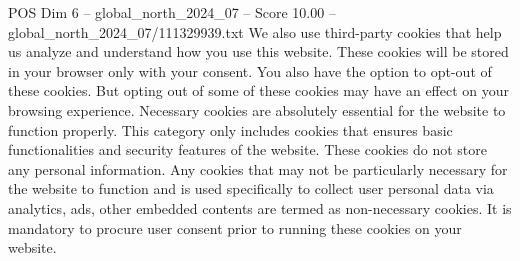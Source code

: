 \begin{textsample}{POS Dim 6 – global\_north\_2024\_07 – Score 10.00 – global\_north\_2024\_07/111329939.txt}
We also use third-party cookies that help us analyze and understand how you use this website.
These cookies will be stored in your browser only with your consent.
You also have the option to opt-out of these cookies.
But opting out of some of these cookies may have an effect on your browsing experience.
Necessary cookies are absolutely essential for the website to function properly.
This category only includes cookies that ensures basic functionalities and security features of the website.
These cookies do not store any personal information.
Any cookies that may not be particularly necessary for the website to function and is used specifically to collect user personal data via analytics, ads, other embedded contents are termed as non-necessary cookies.
It is mandatory to procure user consent prior to running these cookies on your website.

\end{textsample}
